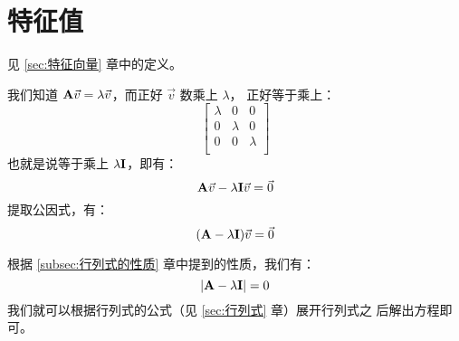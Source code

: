 \section{特征值} \label{sec:特征值}
见 \ref{sec:特征向量} 章中的定义。

我们知道 $\mathbf{A} \vec v = \lambda \vec v$，而正好 $\vec v$ 数乘上 $\lambda$，
正好等于乘上：\[
    \begin{bmatrix}
        \lambda & 0 & 0 \\
        0 & \lambda & 0 \\
        0 & 0 & \lambda \\
    \end{bmatrix}
\]也就是说等于乘上 $\lambda \mathbf{I}$，即有：\[
    \mathbf{A} \vec v - \lambda \mathbf{I} \vec v = \vec 0
\]提取公因式，有：\[
    (\mathbf{A} - \lambda \mathbf{I}) \vec v = \vec 0
\]

根据 \ref{subsec:行列式的性质} 章中提到的性质，我们有：\[ |\mathbf{A} - \lambda
\mathbf{I}| = 0 \]我们就可以根据行列式的公式（见 \ref{sec:行列式} 章）展开行列式之
后解出方程即可。
